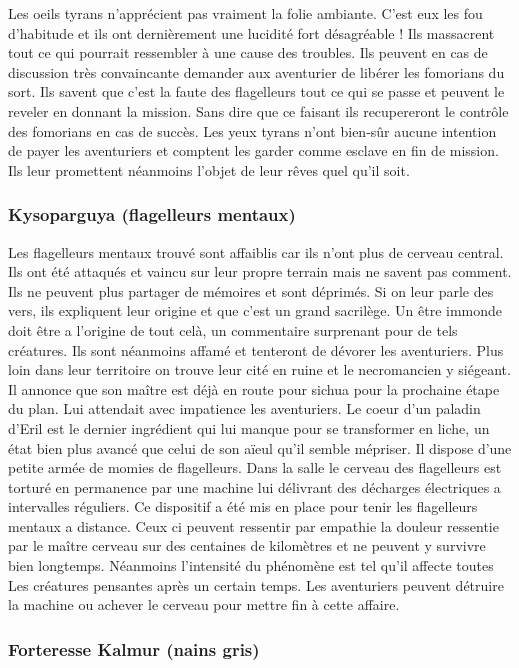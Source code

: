 Les oeils tyrans n'apprécient pas vraiment la folie ambiante. C'est eux les fou d'habitude et ils ont dernièrement une lucidité fort désagréable ! Ils massacrent tout ce qui pourrait ressembler à une cause des troubles. Ils peuvent en cas de discussion très convaincante demander aux aventurier de libérer les fomorians du sort. Ils savent que c'est la faute des flagelleurs tout ce qui se passe et peuvent le reveler en donnant la mission. Sans dire que ce faisant ils recupereront le contrôle des fomorians en cas de succès. Les yeux tyrans n'ont bien-sûr aucune intention de payer les aventuriers et comptent les garder comme esclave en fin de mission. Ils leur promettent néanmoins l'objet de leur rêves quel qu'il soit.

\subsubsection*{Kysoparguya (flagelleurs mentaux)}

Les flagelleurs mentaux trouvé sont affaiblis car ils n'ont plus de cerveau central. Ils ont été attaqués et vaincu sur leur propre terrain mais ne savent pas comment. Ils ne peuvent plus partager de mémoires et sont déprimés. Si on leur parle des vers, ils expliquent leur origine et que c'est un grand sacrilège. Un être immonde doit être a l'origine de tout celà, un commentaire surprenant pour de tels créatures. Ils sont néanmoins affamé et tenteront de dévorer les aventuriers. Plus loin dans leur territoire on trouve leur cité en ruine et le necromancien y siégeant. Il annonce que son maître est déjà en route pour sichua pour la prochaine étape du plan. Lui attendait avec impatience les aventuriers. Le coeur d'un paladin d'Eril est le dernier ingrédient qui lui manque pour se transformer en liche, un état bien plus avancé que celui de son aïeul qu'il semble mépriser. Il dispose d'une petite armée de momies de flagelleurs. Dans la salle le cerveau des flagelleurs est torturé en permanence par une machine lui délivrant des décharges électriques a intervalles réguliers. Ce dispositif a été mis en place pour tenir les flagelleurs mentaux a distance. Ceux ci peuvent ressentir par empathie la douleur ressentie par le maître cerveau sur des centaines de kilomètres et ne peuvent y survivre bien longtemps. Néanmoins l'intensité du phénomène est tel qu'il affecte toutes Les créatures pensantes après un certain temps. Les aventuriers peuvent détruire la machine ou achever le cerveau pour mettre fin à cette affaire.

\subsubsection*{Forteresse Kalmur (nains gris)}

